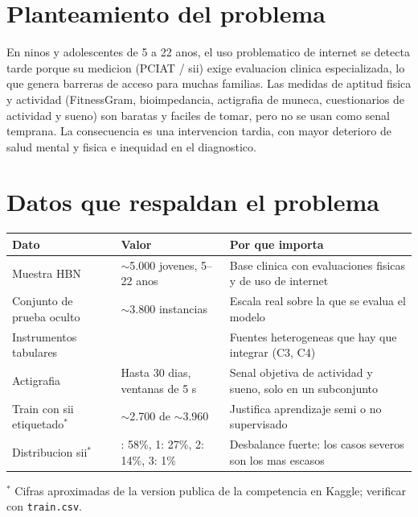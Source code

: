 \documentclass[10pt,letterpaper]{article}
\begin{document}
\begin{landscape}
\begin{center}
\end{center}
\end{landscape}
 
\section{Planteamiento del problema}
\begin{center}
\colorbox{ambar}{\parbox{0.94\linewidth}{\vspace{6pt}
En ninos y adolescentes de 5 a 22 anos, el uso problematico de internet se detecta tarde porque
su medicion (PCIAT / sii) exige evaluacion clinica especializada, lo que genera barreras de
acceso para muchas familias. Las medidas de aptitud fisica y actividad (FitnessGram,
bioimpedancia, actigrafia de muneca, cuestionarios de actividad y sueno) son baratas y faciles
de tomar, pero no se usan como senal temprana. La consecuencia es una intervencion tardia, con
mayor deterioro de salud mental y fisica e inequidad en el diagnostico.\vspace{6pt}}}
\end{center}
 
\section{Datos que respaldan el problema}
\begin{center}
\small
\begin{tabularx}{\linewidth}{>{\raggedright\arraybackslash}p{4.2cm} >{\raggedright\arraybackslash}p{3.8cm} X}
\toprule
\textbf{Dato} & \textbf{Valor} & \textbf{Por que importa} \\
\midrule
Muestra HBN & $\sim$5.000 jovenes, 5--22 anos & Base clinica con evaluaciones fisicas y de uso de internet \\
Conjunto de prueba oculto & $\sim$3.800 instancias & Escala real sobre la que se evalua el modelo \\
Instrumentos tabulares & 11 & Fuentes heterogeneas que hay que integrar (C3, C4) \\
Actigrafia & Hasta 30 dias, ventanas de 5 s & Senal objetiva de actividad y sueno, solo en un subconjunto \\
Train con sii etiquetado$^{*}$ & $\sim$2.700 de $\sim$3.960 & Justifica aprendizaje semi o no supervisado \\
Distribucion sii$^{*}$ & 0: 58\%, 1: 27\%, 2: 14\%, 3: 1\% & Desbalance fuerte: los casos severos son los mas escasos \\
\bottomrule
\end{tabularx}
\end{center}
{\footnotesize $^{*}$ Cifras aproximadas de la version publica de la competencia en Kaggle; verificar con \texttt{train.csv}.}
 
\end{document}
